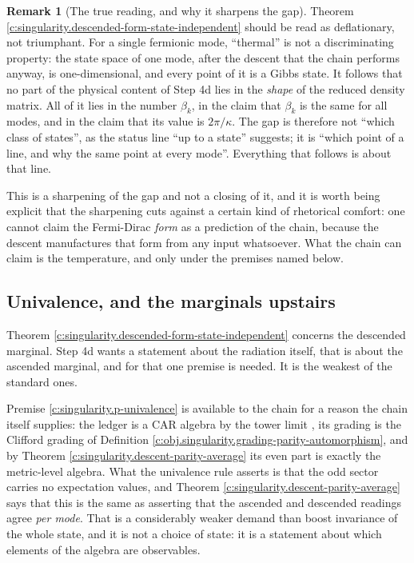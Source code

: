 \documentclass[11pt]{article}
\theoremstyle{definition}
\newtheorem{remark}[theorem]{Remark}
\theoremstyle{plain}
\begin{document}
\begin{remark}[The true reading, and why it sharpens the gap]\label{c:note.state-selection.true-reading-why-it-sharpens-gap}
Theorem \ref{c:singularity.descended-form-state-independent} should be read as deflationary, not triumphant. For a single fermionic mode, ``thermal'' is not a discriminating property: the state space of one mode, after the descent that the chain performs anyway, is one-dimensional, and every point of it is a Gibbs state. It follows that no part of the physical content of Step 4d lies in the \emph{shape} of the reduced density matrix. All of it lies in the number $\beta_k$, in the claim that $\beta_k$ is the same for all modes, and in the claim that its value is $2\pi/\kappa$. The gap is therefore not ``which class of states'', as the status line ``up to a state'' suggests; it is ``which point of a line, and why the same point at every mode''. Everything that follows is about that line.

This is a sharpening of the gap and not a closing of it, and it is worth being explicit that the sharpening cuts against a certain kind of rhetorical comfort: one cannot claim the Fermi-Dirac \emph{form} as a prediction of the chain, because the descent manufactures that form from any input whatsoever. What the chain can claim is the temperature, and only under the premises named below.
\end{remark}

\subsection*{Univalence, and the marginals upstairs}
\label{c:note.state-selection.setting-univalence-marginals-upstairs}
Theorem \ref{c:singularity.descended-form-state-independent} concerns the descended marginal. Step 4d wants a statement about the radiation itself, that is about the ascended marginal, and for that one premise is needed. It is the weakest of the standard ones.

\label{c:note.state-selection.setting-univalence-marginals-upstairs-2}
Premise \ref{c:singularity.p-univalence} is available to the chain for a reason the chain itself supplies: the ledger is a CAR algebra by the tower limit \cite[Thm.~5.6]{ButlerT3}, its grading is the Clifford grading of Definition \ref{c:obj.singularity.grading-parity-automorphism}, and by Theorem \ref{c:singularity.descent-parity-average} its even part is exactly the metric-level algebra. What the univalence rule asserts is that the odd sector carries no expectation values, and Theorem \ref{c:singularity.descent-parity-average} says that this is the same as asserting that the ascended and descended readings agree \emph{per mode}. That is a considerably weaker demand than boost invariance of the whole state, and it is not a choice of state: it is a statement about which elements of the algebra are observables.
\end{document}
